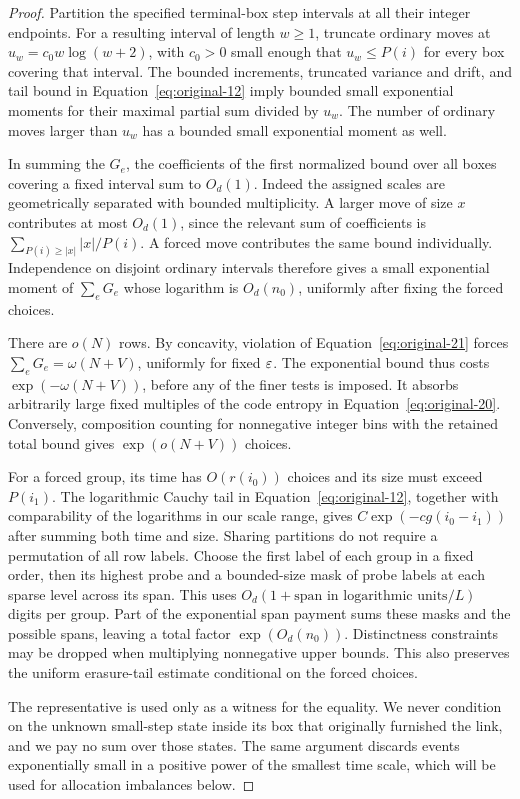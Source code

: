 \begin{proof}
Partition the specified terminal-box step intervals at all their
integer endpoints.  For a resulting interval of length $w\ge1$,
truncate ordinary moves at
$u_w=c_0w\log(w+2)$, with $c_0>0$ small enough that
$u_w\le P(i)$ for every box covering that interval.  The bounded
increments, truncated variance and drift, and tail bound in
Equation~\eqref{eq:original-12} imply bounded small exponential
moments for their maximal partial sum divided by $u_w$.  The number
of ordinary moves larger than $u_w$ has a bounded small exponential
moment as well.

In summing the $G_e$, the coefficients of the first normalized bound
over all boxes covering a fixed interval sum to $O_d(1)$.
Indeed the assigned scales are geometrically separated with bounded
multiplicity.  A larger move of size $x$ contributes at most
$O_d(1)$, since the relevant sum of coefficients is
$\sum_{P(i)\ge |x|}|x|/P(i)$.  A forced move contributes the same
bound individually.  Independence on disjoint ordinary intervals
therefore gives a small exponential moment of $\sum_eG_e$ whose
logarithm is $O_d(n_0)$, uniformly after fixing the forced choices.

There are $o(N)$ rows.  By concavity, violation of
Equation~\eqref{eq:original-21} forces
$\sum_eG_e=\omega(N+V)$, uniformly for fixed $\varepsilon$.
The exponential bound thus costs $\exp(-\omega(N+V))$, before
any of the finer tests is imposed.  It absorbs arbitrarily large
fixed multiples of the code entropy in
Equation~\eqref{eq:original-20}.  Conversely, composition counting
for nonnegative integer bins with the retained total bound gives
$\exp(o(N+V))$ choices.

For a forced group, its time has $O(r(i_0))$ choices and its size
must exceed $P(i_1)$.  The logarithmic Cauchy tail in
Equation~\eqref{eq:original-12}, together with comparability of the
logarithms in our scale range, gives
$C\exp(-cg(i_0-i_1))$ after summing both time and size.
Sharing partitions do not require a permutation of all row labels.
Choose the first label of each group in a fixed order, then its
highest probe and a bounded-size mask of probe labels at each sparse
level across its span.  This uses
$O_d(1+\text{span in logarithmic units}/L)$ digits per group.
Part of the exponential span payment sums these masks and the
possible spans, leaving a total factor $\exp(O_d(n_0))$.
Distinctness constraints may be dropped when multiplying nonnegative
upper bounds.  This also preserves the uniform erasure-tail estimate
conditional on the forced choices.

The representative is used only as a witness for the equality.  We
never condition on the unknown small-step state inside its box that
originally furnished the link, and we pay no sum over those states.
The same argument discards events exponentially small in a positive
power of the smallest time scale, which will be used for allocation
imbalances below.
\end{proof}


